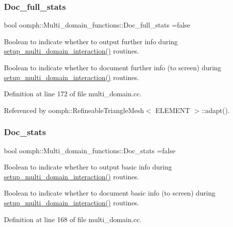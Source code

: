 \subsubsection{\texorpdfstring{Doc\+\_\+full\+\_\+stats}{Doc\_full\_stats}}
{\footnotesize\ttfamily bool oomph\+::\+Multi\+\_\+domain\+\_\+functions\+::\+Doc\+\_\+full\+\_\+stats =false}



Boolean to indicate whether to output further info during \hyperlink{namespaceoomph_1_1Multi__domain__functions_ac64183e03f173c69ed6ed6f493a1a67e}{setup\+\_\+multi\+\_\+domain\+\_\+interaction()} routines. 

Boolean to indicate whether to document further info (to screen) during \hyperlink{namespaceoomph_1_1Multi__domain__functions_ac64183e03f173c69ed6ed6f493a1a67e}{setup\+\_\+multi\+\_\+domain\+\_\+interaction()} routines. 

Definition at line 172 of file multi\+\_\+domain.\+cc.



Referenced by oomph\+::\+Refineable\+Triangle\+Mesh$<$ E\+L\+E\+M\+E\+N\+T $>$\+::adapt().

\mbox{\label{namespaceoomph_1_1Multi__domain__functions_aa490ae6349c68dc3c5b40f6a4a40e718}} 
\subsubsection{\texorpdfstring{Doc\+\_\+stats}{Doc\_stats}}
{\footnotesize\ttfamily bool oomph\+::\+Multi\+\_\+domain\+\_\+functions\+::\+Doc\+\_\+stats =false}



Boolean to indicate whether to output basic info during \hyperlink{namespaceoomph_1_1Multi__domain__functions_ac64183e03f173c69ed6ed6f493a1a67e}{setup\+\_\+multi\+\_\+domain\+\_\+interaction()} routines. 

Boolean to indicate whether to document basic info (to screen) during \hyperlink{namespaceoomph_1_1Multi__domain__functions_ac64183e03f173c69ed6ed6f493a1a67e}{setup\+\_\+multi\+\_\+domain\+\_\+interaction()} routines. 

Definition at line 168 of file multi\+\_\+domain.\+cc.



